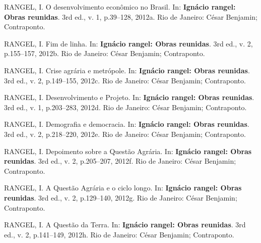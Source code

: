 \documentclass[a4paper, 12pt]{article}
\begin{document}
\leavevmode\hypertarget{ref-rangel1954}{}%
RANGEL, I. O desenvolvimento econômico no Brasil. In: \textbf{Ignácio
rangel: Obras reunidas}. 3rd ed., v. 1, p.39--128, 2012a. Rio de
Janeiro: César Benjamin; Contraponto.

\leavevmode\hypertarget{ref-rangel1988}{}%
RANGEL, I. Fim de linha. In: \textbf{Ignácio rangel: Obras reunidas}.
3rd ed., v. 2, p.155--157, 2012b. Rio de Janeiro: César Benjamin;
Contraponto.

\leavevmode\hypertarget{ref-rangel1986a}{}%
RANGEL, I. Crise agrária e metrópole. In: \textbf{Ignácio rangel: Obras
reunidas}. 3rd ed., v. 2, p.149--155, 2012c. Rio de Janeiro: César
Benjamin; Contraponto.

\leavevmode\hypertarget{ref-rangel1956}{}%
RANGEL, I. Desenvolvimento e Projeto. In: \textbf{Ignácio rangel: Obras
reunidas}. 3rd ed., v. 1, p.203--283, 2012d. Rio de Janeiro: César
Benjamin; Contraponto.

\leavevmode\hypertarget{ref-rangel1961}{}%
RANGEL, I. Demografia e democracia. In: \textbf{Ignácio rangel: Obras
reunidas}. 3rd ed., v. 2, p.218--220, 2012e. Rio de Janeiro: César
Benjamin; Contraponto.

\leavevmode\hypertarget{ref-rangel1960}{}%
RANGEL, I. Depoimento sobre a Questão Agrária. In: \textbf{Ignácio
rangel: Obras reunidas}. 3rd ed., v. 2, p.205--207, 2012f. Rio de
Janeiro: César Benjamin; Contraponto.

\leavevmode\hypertarget{ref-rangel1986b}{}%
RANGEL, I. A Questão Agrária e o ciclo longo. In: \textbf{Ignácio
rangel: Obras reunidas}. 3rd ed., v. 2, p.129--140, 2012g. Rio de
Janeiro: César Benjamin; Contraponto.

\leavevmode\hypertarget{ref-rangel1986c}{}%
RANGEL, I. A Questão da Terra. In: \textbf{Ignácio rangel: Obras
reunidas}. 3rd ed., v. 2, p.141--149, 2012h. Rio de Janeiro: César
Benjamin; Contraponto.
\end{document}
